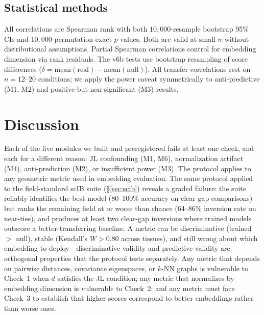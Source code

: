 \documentclass[9pt,lineno]{elife}
\begin{document}
\subsection{Statistical methods}

All correlations are Spearman rank with both $10{,}000$-resample bootstrap 95\% CIs and $10{,}000$-permutation exact $p$-values. Both are valid at small $n$ without distributional assumptions. Partial Spearman correlations control for embedding dimension via rank residuals. The v6b tests use bootstrap resampling of score differences ($\delta = \text{mean}(\text{real}) - \text{mean}(\text{null})$). All transfer correlations rest on $n = 12$--$20$ conditions; we apply the power caveat symmetrically to anti-predictive (M1, M2) and positive-but-non-significant (M3) results.


\section{Discussion}

Each of the five modules we built and preregistered fails at least one check, and each for a different reason: JL confounding (M1, M6), normalization artifact (M4), anti-prediction (M2), or insufficient power (M3). The protocol applies to any geometric metric used in embedding evaluation. The same protocol applied to the field-standard scIB suite (\S\ref{sec:scib}) reveals a graded failure: the suite reliably identifies the best model (80--100\% accuracy on clear-gap comparisons) but ranks the remaining field at or worse than chance (64--86\% inversion rate on near-ties), and produces at least two clear-gap inversions where trained models outscore a better-transferring baseline. A metric can be discriminative (trained $>$ null), stable (Kendall's $W > 0.80$ across tissues), and still wrong about which embedding to deploy---discriminative validity and predictive validity are orthogonal properties that the protocol tests separately. Any metric that depends on pairwise distances, covariance eigenspaces, or $k$-NN graphs is vulnerable to Check~1 when $d$ satisfies the JL condition; any metric that normalizes by embedding dimension is vulnerable to Check~2; and any metric must face Check~3 to establish that higher scores correspond to better embeddings rather than worse ones.
\end{document}
